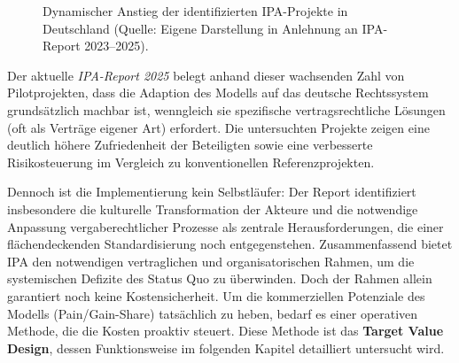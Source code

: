 \begin{figure}[htbp]
    \centering
    \caption[Entwicklung der IPA-Projektanzahl]{Dynamischer Anstieg der identifizierten \acs{IPA}-Projekte in Deutschland (Quelle: Eigene Darstellung in Anlehnung an \acs{IPA}-Report 2023--2025).}
    \label{fig:ipa_hochlauf}
\end{figure}

Der aktuelle \textit{\acs{IPA}-Report 2025} belegt anhand dieser wachsenden Zahl von Pilotprojekten, dass die Adaption des Modells auf das deutsche Rechtssystem grundsätzlich machbar ist, wenngleich sie spezifische vertragsrechtliche Lösungen (oft als Verträge eigener Art) erfordert. Die untersuchten Projekte zeigen eine deutlich höhere Zufriedenheit der Beteiligten sowie eine verbesserte Risikosteuerung im Vergleich zu konventionellen Referenzprojekten. \autocite[Vgl.][S.~11]{haghsheno_ipa-report_2025}

Dennoch ist die Implementierung kein Selbstläufer: Der Report identifiziert insbesondere die kulturelle Transformation der Akteure und die notwendige Anpassung vergaberechtlicher Prozesse als zentrale Herausforderungen, die einer flächendeckenden Standardisierung noch entgegenstehen.
Zusammenfassend bietet \acs{IPA} den notwendigen vertraglichen und organisatorischen Rahmen, um die systemischen Defizite des Status Quo zu überwinden. Doch der Rahmen allein garantiert noch keine Kostensicherheit. Um die kommerziellen Potenziale des Modells (Pain/Gain-Share) tatsächlich zu heben, bedarf es einer operativen Methode, die die Kosten proaktiv steuert. Diese Methode ist das \textbf{Target Value Design}, dessen Funktionsweise im folgenden Kapitel detailliert untersucht wird.



